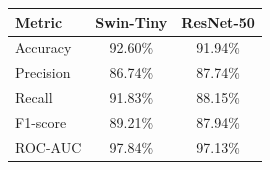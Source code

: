 \begin{tabular}{lcc}
\toprule
Metric & Swin-Tiny & ResNet-50\\
\midrule
Accuracy & 92.60\% & 91.94\%\\
Precision & 86.74\% & 87.74\%\\
Recall & 91.83\% & 88.15\%\\
F1-score & 89.21\% & 87.94\%\\
ROC-AUC & 97.84\% & 97.13\%\\
\bottomrule
\end{tabular}